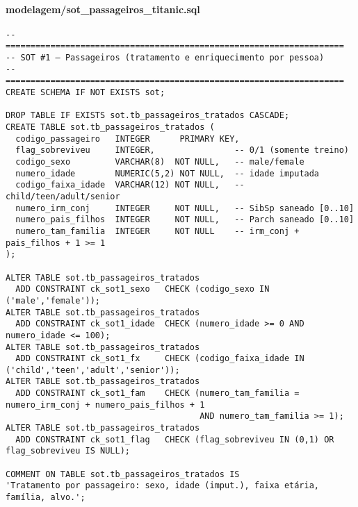 \documentclass[12pt,a4paper]{article}
\begin{document}
\paragraph{modelagem/sot\_passageiros\_titanic.sql}
\begin{verbatim}
-- ====================================================================
-- SOT #1 — Passageiros (tratamento e enriquecimento por pessoa)
-- ====================================================================
CREATE SCHEMA IF NOT EXISTS sot;

DROP TABLE IF EXISTS sot.tb_passageiros_tratados CASCADE;
CREATE TABLE sot.tb_passageiros_tratados (
  codigo_passageiro   INTEGER      PRIMARY KEY,
  flag_sobreviveu     INTEGER,                -- 0/1 (somente treino)
  codigo_sexo         VARCHAR(8)  NOT NULL,   -- male/female
  numero_idade        NUMERIC(5,2) NOT NULL,  -- idade imputada
  codigo_faixa_idade  VARCHAR(12) NOT NULL,   -- child/teen/adult/senior
  numero_irm_conj     INTEGER     NOT NULL,   -- SibSp saneado [0..10]
  numero_pais_filhos  INTEGER     NOT NULL,   -- Parch saneado [0..10]
  numero_tam_familia  INTEGER     NOT NULL    -- irm_conj + pais_filhos + 1 >= 1
);

ALTER TABLE sot.tb_passageiros_tratados
  ADD CONSTRAINT ck_sot1_sexo   CHECK (codigo_sexo IN ('male','female'));
ALTER TABLE sot.tb_passageiros_tratados
  ADD CONSTRAINT ck_sot1_idade  CHECK (numero_idade >= 0 AND numero_idade <= 100);
ALTER TABLE sot.tb_passageiros_tratados
  ADD CONSTRAINT ck_sot1_fx     CHECK (codigo_faixa_idade IN ('child','teen','adult','senior'));
ALTER TABLE sot.tb_passageiros_tratados
  ADD CONSTRAINT ck_sot1_fam    CHECK (numero_tam_familia = numero_irm_conj + numero_pais_filhos + 1
                                       AND numero_tam_familia >= 1);
ALTER TABLE sot.tb_passageiros_tratados
  ADD CONSTRAINT ck_sot1_flag   CHECK (flag_sobreviveu IN (0,1) OR flag_sobreviveu IS NULL);

COMMENT ON TABLE sot.tb_passageiros_tratados IS
'Tratamento por passageiro: sexo, idade (imput.), faixa etária, família, alvo.';


\end{verbatim}
\end{document}

